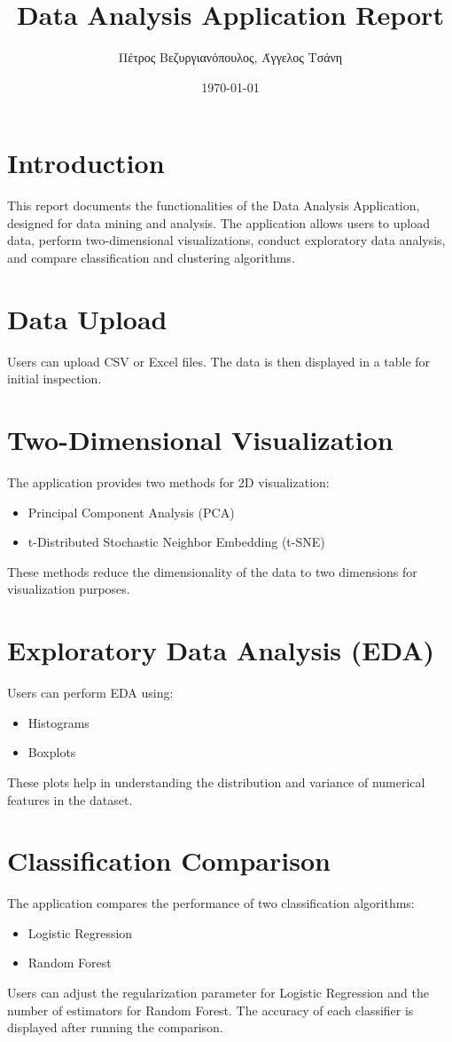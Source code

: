 \documentclass{article}
\title{Data Analysis Application Report}
\author{Πέτρος Βεζυργιανόπουλος, Άγγελος Τσάνη}
\date{\today}
\begin{document}
\maketitle

\section{Introduction}
This report documents the functionalities of the Data Analysis Application, designed for data mining and analysis. The application allows users to upload data, perform two-dimensional visualizations, conduct exploratory data analysis, and compare classification and clustering algorithms.

\section{Data Upload}
Users can upload CSV or Excel files. The data is then displayed in a table for initial inspection.

\section{Two-Dimensional Visualization}
The application provides two methods for 2D visualization:
\begin{itemize}
    \item Principal Component Analysis (PCA)
    \item t-Distributed Stochastic Neighbor Embedding (t-SNE)
\end{itemize}
These methods reduce the dimensionality of the data to two dimensions for visualization purposes.

\section{Exploratory Data Analysis (EDA)}
Users can perform EDA using:
\begin{itemize}
    \item Histograms
    \item Boxplots
\end{itemize}
These plots help in understanding the distribution and variance of numerical features in the dataset.

\section{Classification Comparison}
The application compares the performance of two classification algorithms:
\begin{itemize}
    \item Logistic Regression
    \item Random Forest
\end{itemize}
Users can adjust the regularization parameter for Logistic Regression and the number of estimators for Random Forest. The accuracy of each classifier is displayed after running the comparison.
\end{document}

